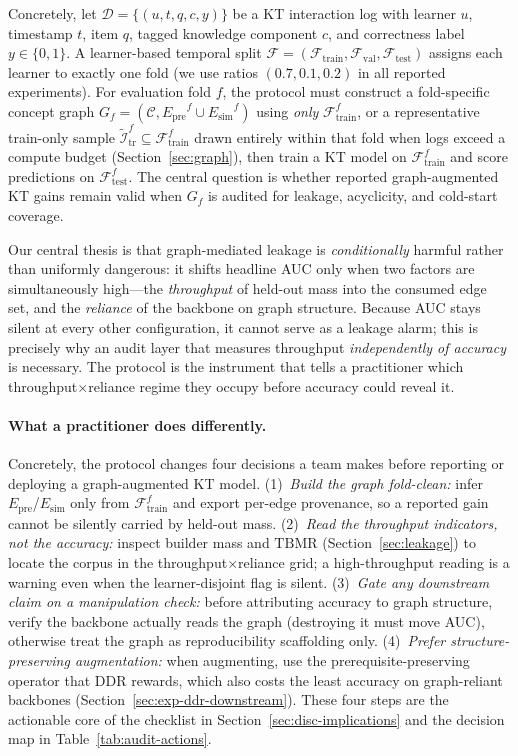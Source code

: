 \documentclass[pdflatex,sn-mathphys-num]{sn-jnl}
\newcommand{\Epre}{\ensuremath{E_{\text{pre}}}}
\newcommand{\Esim}{\ensuremath{E_{\text{sim}}}}
\newcommand{\KC}{knowledge component}
\newcommand{\DDR}{\textsc{DDR}}
\begin{document}
Concretely, let $\mathcal{D}=\{(u,t,q,c,y)\}$ be a KT interaction log
with learner $u$, timestamp $t$, item $q$, tagged \KC{} $c$, and
correctness label $y\in\{0,1\}$. A learner-based temporal split
$\mathcal{F}=(\mathcal{F}_{\text{train}},\mathcal{F}_{\text{val}},
\mathcal{F}_{\text{test}})$ assigns each learner to exactly one fold
(we use ratios $(0.7,0.1,0.2)$ in all reported experiments). For
evaluation fold $f$, the protocol must construct a fold-specific concept
graph $G_f=(\mathcal{C},\Epre^f\cup\Esim^f)$ using \emph{only}
$\mathcal{F}_{\text{train}}^f$, or a representative train-only sample
$\tilde{\mathcal{I}}^f_{\text{tr}}\subseteq\mathcal{F}^f_{\text{train}}$
drawn entirely within that fold when logs exceed a compute budget
(Section~\ref{sec:graph}), then train a KT model on
$\mathcal{F}_{\text{train}}^f$ and score predictions on
$\mathcal{F}_{\text{test}}^f$. The central question is whether reported
graph-augmented KT gains remain valid when $G_f$ is audited for leakage,
acyclicity, and cold-start coverage.

Our central thesis is that graph-mediated leakage is \emph{conditionally}
harmful rather than uniformly dangerous: it shifts headline AUC only when two
factors are simultaneously high---the \emph{throughput} of held-out mass into
the consumed edge set, and the \emph{reliance} of the backbone on graph
structure. Because AUC stays silent at every other configuration, it cannot
serve as a leakage alarm; this is precisely why an audit layer that measures
throughput \emph{independently of accuracy} is necessary. The protocol is the
instrument that tells a practitioner which throughput$\times$reliance regime
they occupy before accuracy could reveal it.

\paragraph{What a practitioner does differently.}
Concretely, the protocol changes four decisions a team makes before reporting or
deploying a graph-augmented KT model. (1)~\emph{Build the graph fold-clean:}
infer $\Epre$/$\Esim$ only from $\mathcal{F}^f_{\text{train}}$ and export
per-edge provenance, so a reported gain cannot be silently carried by held-out
mass. (2)~\emph{Read the throughput indicators, not the accuracy:} inspect
builder mass and $\mathrm{TBMR}$ (Section~\ref{sec:leakage}) to locate
the corpus in the throughput$\times$reliance grid; a high-throughput reading is
a warning even when the learner-disjoint flag is silent. (3)~\emph{Gate any
downstream claim on a manipulation check:} before attributing accuracy to graph
structure, verify the backbone actually reads the graph (destroying it must move
AUC), otherwise treat the graph as reproducibility scaffolding only. (4)~\emph{Prefer
structure-preserving augmentation:} when augmenting, use the
prerequisite-preserving operator that \DDR{} rewards, which also costs the least
accuracy on graph-reliant backbones (Section~\ref{sec:exp-ddr-downstream}). These
four steps are the actionable core of the checklist in
Section~\ref{sec:disc-implications} and the decision map in
Table~\ref{tab:audit-actions}.
\end{document}
